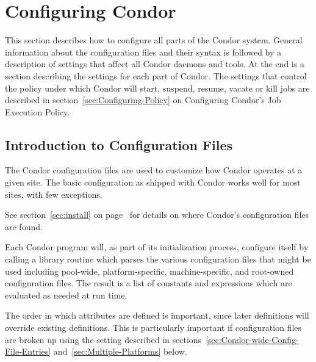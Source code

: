 \section{\label{sec:Configuring-Condor}
Configuring Condor}


This section describes how to configure all parts of the Condor
system.  General information about the configuration
files and their syntax is followed by a description of
settings that affect all
Condor daemons and tools.  At the end is a section describing the
settings for each part of Condor.  The 
settings that control the policy under which Condor will start,
suspend, resume, vacate or kill jobs
are described in 
section~\ref{sec:Configuring-Policy} on Configuring Condor's Job
Execution Policy. 

\subsection{\label{sec:Intro-to-Config-Files}
Introduction to Configuration Files}

The Condor configuration files are used to customize how Condor
operates at a given site.  The basic configuration as shipped with
Condor works well for most sites, with few exceptions.

See section~\ref{sec:install} on
page~\pageref{sec:install}
for details on where
Condor's configuration files are found.

Each Condor program will, as part of its initialization process,
configure itself by calling a library routine which parses the
various configuration files that might be used including pool-wide,
platform-specific, machine-specific, and root-owned configuration files.
The result is a list of constants and expressions which are
evaluated as needed at run time.

The order in which attributes are defined is important, since later
definitions will override existing definitions.
This is particularly important if configuration files are broken up
using the  setting described in
sections~\ref{sec:Condor-wide-Config-File-Entries}
and~\ref{sec:Multiple-Platforms} below.

